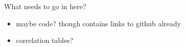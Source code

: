 \documentclass[a4paper, 12pt]{scrreprt}
\begin{document}
\printbibliography[	heading=bibintoc,			%
										title={Bibliography},
										nottype=online]
\nocite{*} %




\begin{appendices}

What needs to go in here?
\begin{itemize}
	\item maybe code? though contains links to github already
	\item correlation tables? 
\end{itemize}


	
\end{appendices}
\end{document}
